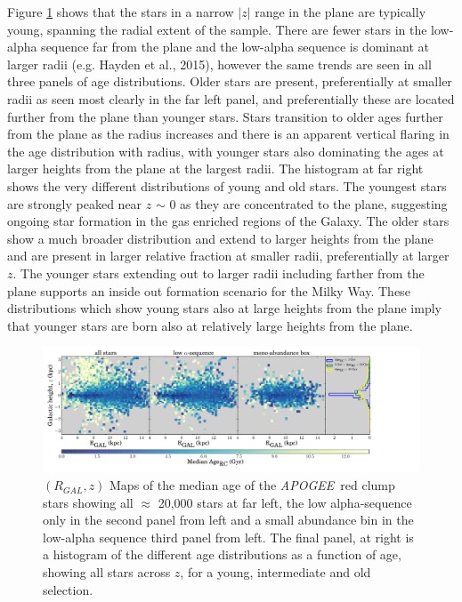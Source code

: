 \documentclass[12pt, preprint]{aastex}
\newcommand{\project}[1]{\textsl{#1}}
\newcommand{\apogee}{\project{APOGEE}}
\begin{document}
Figure \ref{fig:redclump_age} shows that the stars in a narrow $|z|$ range in the plane are typically young, spanning the radial extent of the sample. There are fewer stars in the low-alpha sequence far from the plane and the low-alpha sequence is dominant at larger radii (e.g. Hayden et al., 2015), however the same trends are seen in all three panels of age distributions. Older stars are present, preferentially at smaller radii as seen most clearly in the far left panel, and preferentially these are located further from the plane than younger stars. Stars transition to older ages further from the plane as the radius increases and there is an apparent vertical flaring in the age distribution with radius, with younger stars also dominating the ages at larger heights from the plane at the largest radii. The histogram at far right shows the very different distributions of young and old stars. The youngest stars are strongly peaked near $z$ $\sim$ 0 as they are concentrated to the plane, suggesting ongoing star formation in the gas enriched regions of the Galaxy. The older stars show a much broader distribution and extend to larger heights from the plane and are present in larger relative fraction at smaller radii, preferentially at larger $z$.  The younger stars extending out to larger radii including farther from the plane supports an inside out formation scenario for the Milky Way. These distributions which show young stars also at large heights from the plane imply that younger stars are born also at relatively large heights from the plane. %

\begin{figure}[h!]
\centering
        \includegraphics[scale=0.43]{./plots/agealphamap_hist.pdf}
    \caption{$(R_{GAL},z)$ Maps of the median age of the  \apogee\ red clump stars showing all $\approx$ 20,000 stars at far left, the low alpha-sequence only in the second panel from left and a small abundance bin in the low-alpha sequence third panel from left. The final panel, at right is a histogram of the different age distributions as a function of age, showing all stars across $z$, for a young, intermediate and old selection.  }
\label{fig:redclump_age}
\end{figure}
\end{document}
